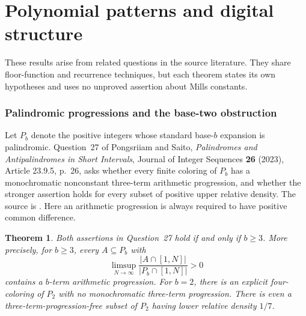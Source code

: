 \documentclass[11pt,a4paper]{article}
\newtheorem{theorem}{Theorem}[section]
\theoremstyle{definition}
\theoremstyle{remark}
\numberwithin{equation}{section}
\begin{document}
\clearpage
\part{Polynomial patterns and digital structure}\label{part:patterns}
These results arise from related questions in the source literature. They share floor-function and recurrence techniques, but each theorem states its own hypotheses and uses no unproved assertion about Mills constants.

\section{Palindromic progressions and the base-two obstruction}

Let $P_b$ denote the positive integers whose standard base-$b$ expansion is
palindromic.  Question~27 of Pongsriiam and Saito, \emph{Palindromes and
Antipalindromes in Short Intervals}, Journal of Integer Sequences \textbf{26}
(2023), Article 23.9.5, p.~26, asks whether every finite coloring of $P_b$ has
a monochromatic nonconstant three-term arithmetic progression, and whether
the stronger assertion holds for every subset of positive upper relative
density.  The source is
\cite{PongsriiamSaito2023}.
Here an arithmetic progression is always required to have positive common
difference.

\begin{theorem}\label{sur:thm:palindrome-classification}
Both assertions in Question~27 hold if and only if $b\geq3$.
More precisely, for $b\geq3$, every $A\subseteq P_b$ with
\[
 \limsup_{N\to\infty}
 \frac{|A\cap[1,N]|}{|P_b\cap[1,N]|}>0
\]
contains a $b$-term arithmetic progression.  For $b=2$, there is an explicit
four-coloring of $P_2$ with no monochromatic three-term progression.
There is even a three-term-progression-free subset of $P_2$ having lower
relative density $1/7$.
\end{theorem}
\end{document}
